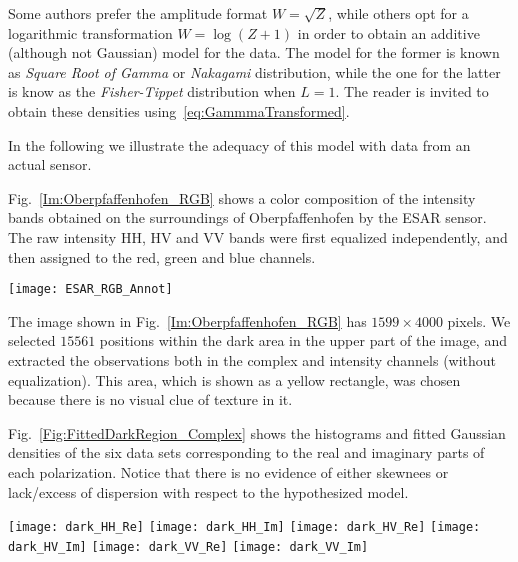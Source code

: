 Some authors\cite{IterativeWeightedMaximumLikelihoodDenoising} prefer the amplitude format $W=\sqrt{Z}$, while others\cite{Santos2017} opt for a logarithmic transformation $W=\log(Z+1)$ in order to obtain an additive (although not Gaussian) model for the data.
The model for the former is known as \textit{Square Root of Gamma} or \textit{Nakagami} distribution,
while the one for the latter is know as the \textit{Fisher-Tippet} distribution when $L=1$.
The reader is invited to obtain these densities using~\eqref{eq:GammmaTransformed}.

In the following we illustrate the adequacy of this model with data from an actual sensor.

Fig.~\ref{Im:Oberpfaffenhofen_RGB} shows a color composition of the intensity bands obtained on the surroundings of Oberpfaffenhofen by the ESAR sensor.
The raw intensity HH, HV and VV bands were first equalized independently, and then assigned to the red, green and blue channels.

\begin{figure*}
\centering
\texttt{[image: ESAR\_RGB\_Annot]}
\caption{Color composition of the equalized intensity bands of an ESAR image over Oberpfaffenhofen}\label{Im:Oberpfaffenhofen_RGB}
\end{figure*}

The image shown in Fig.~\ref{Im:Oberpfaffenhofen_RGB} has $1599\times4000$ pixels.
We selected $15561$ positions within the dark area in the upper part of the image, and extracted the observations both in the complex and intensity channels (without equalization).
This area, which is shown as a yellow rectangle, was chosen because there is no visual clue of texture in it.

Fig.~\ref{Fig:FittedDarkRegion_Complex} shows the histograms and fitted Gaussian densities of the six data sets corresponding to the real and imaginary parts of each polarization.
Notice that there is no evidence of either skewnees or lack/excess of dispersion with respect to the hypothesized model.

\begin{figure*}
\centering
\texttt{[image: dark\_HH\_Re]}
\texttt{[image: dark\_HH\_Im]}
\texttt{[image: dark\_HV\_Re]}
\texttt{[image: dark\_HV\_Im]}
\texttt{[image: dark\_VV\_Re]}
\texttt{[image: dark\_VV\_Im]}
\caption{Histograms and fitted Gaussian densities over the dark region of Fig.~\ref{Im:Oberpfaffenhofen_RGB}}\label{Fig:FittedDarkRegion_Complex}
\end{figure*}

